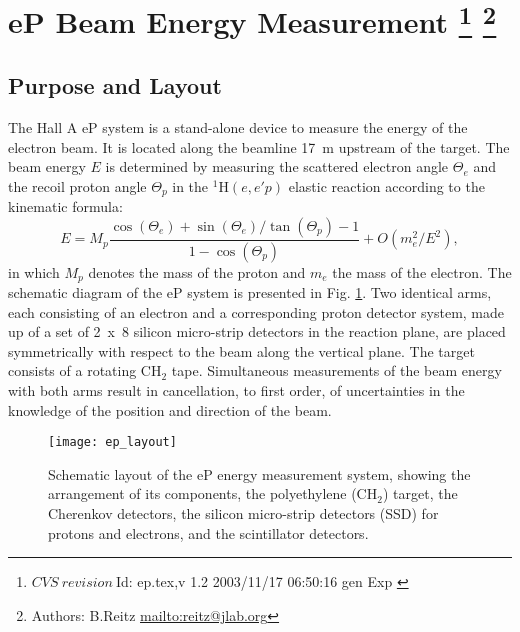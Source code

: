 \section[eP Beam Energy Measurement]{eP Beam Energy Measurement
\footnote{
  $CVS~revision~ $Id: ep.tex,v 1.2 2003/11/17 06:50:16 gen Exp $ $
}
\footnote{Authors: B.Reitz \url{mailto:reitz@jlab.org}}
}
\label{sec:ep}
\subsection {Purpose and Layout}
\label{sec:ep_purpose}

The Hall A eP system is a stand-alone device to measure the 
energy of the electron beam. It is located along the beamline
17~m upstream of the target. The beam energy $E$ is determined by measuring
the scattered electron angle $\Theta_e$ and the recoil proton angle
$\Theta_p$ in the $^1$H$(e,e'p)$ elastic reaction according to the kinematic
formula:
\begin{equation}
E = M_p \frac{\cos(\Theta_e) + \sin(\Theta_e)/\tan(\Theta_p) - 1}{1 - \cos(\Theta_p)} + O(m_e^2/E^2),
\end{equation}
in which $M_p$ denotes the mass of the proton and $m_e$ the mass of the electron.
The schematic diagram of the eP system is presented in Fig. \ref{fig:ep_layout}. 
Two identical arms, each consisting of an electron and a corresponding proton 
detector system, made up of a set of 2~x~8 silicon micro-strip detectors in the
reaction plane, are placed symmetrically with respect to the beam along the 
vertical plane. The target consists of a rotating CH$_2$ tape.
Simultaneous measurements of the beam energy with both arms result
in cancellation, to first order, of uncertainties in the knowledge of the position
and direction of the beam. 
 \begin{figure}[htb]
    \begin{center}
        \texttt{[image: ep\_layout]}
    \end{center}
    \caption[eP: Layout]{
            Schematic layout of the eP energy measurement system,
            showing the arrangement of its components, the polyethylene (CH$_2$) 
            target, the Cherenkov detectors, the silicon micro-strip detectors (SSD) 
            for protons and electrons, and the scintillator detectors.
            }
    \label{fig:ep_layout} 
 \end{figure}  
\clearpage

